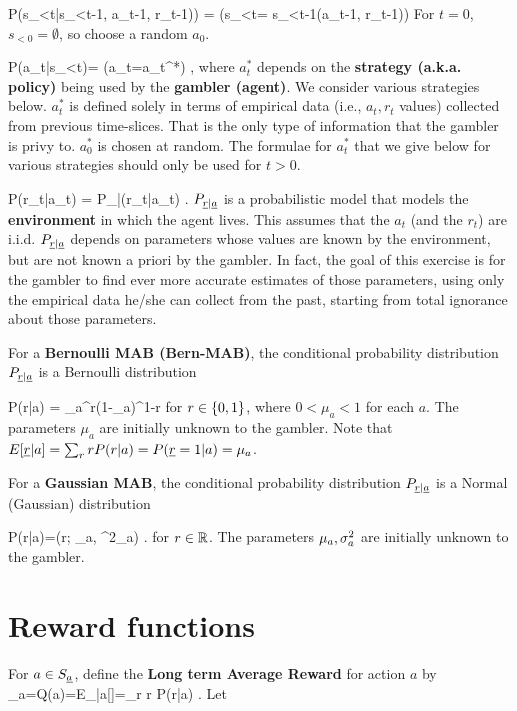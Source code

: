 \beq\color{blue}
P(s_{<t}|s_{<t-1}, a_{t-1}, r_{t-1})) = 
\indi(s_{<t}= s_{<t-1}\cup (a_{t-1}, r_{t-1}))
\eeq
For $t=0$, $s_{<0}=\emptyset$, so
 choose a random $a_0$.

\beq\color{blue}
P(a_t|s_{<t})= \indi(a_t=a_t^*)
\;\;
\;,
\eeq
where $a^*_t$ depends on the
 {\bf strategy (a.k.a. policy)} being used
by the {\bf gambler (agent)}.
We consider various
strategies below.
$a^*_t$ is defined
solely in terms
of empirical data
(i.e., $a_t, r_t$
values)
collected from previous 
time-slices.
That is the only  type of
information that
the gambler 
is privy to.
$a_0^*$ is chosen at random.
The formulae for $a_t^*$
that we give below 
for various strategies
should only be used for $t>0$.

\beq\color{blue}
P(r_t|a_t) =
P_{\rvr|\rva}(r_t|a_t)
\;\;
\;.
\eeq
$P_{{\underline{r}}|{\underline{a}}}$
is 
a probabilistic model that
models the {\bf environment}
in which the agent lives.
This 
assumes that the $a_t$ (and the $r_t$)
are i.i.d.
$P_{{\underline{r}}|{\underline{a}}}$ 
depends on parameters
whose values are known
by the environment, 
but 
are not known
a priori
by the gambler.
In fact, the goal
of this exercise is for
the gambler to
 find 
ever more accurate 
estimates of those parameters,
using only the empirical 
data he/she can collect
from the past,
starting from total
ignorance about those parameters.


For a {\bf Bernoulli MAB (Bern-MAB)}, the 
conditional probability 
distribution $P_{{\underline{r}}|{\underline{a}}}$
is
a Bernoulli distribution 

\beq
P(r|a) = \mu_a^r(1-\mu_a)^{1-r}
\eeq
for $r\in \{0,1\}$, where $0<\mu_a<1$ for each $a$.
The parameters $\mu_a$ are initially 
unknown to the gambler.
Note that $E[{\underline{r}}|a]=
\sum_r r P(r|a)=P({\underline{r}}=1|a)=\mu_a$.

For a {\bf Gaussian MAB}, the 
conditional probability 
distribution $P_{{\underline{r}}|{\underline{a}}}$
is
a Normal (Gaussian) distribution

\beq
P(r|a)=\caln(r; \mu_a, \s^2_a)
\;.
\eeq
for $r\in{ \mathbb{R}}$.
The parameters $\mu_a, \sigma^2_a$ are initially 
unknown to the gambler.
 
\section{Reward functions}




For $a\in S_{\underline{a}}$, define the 
{\bf Long term Average Reward} for action $a$ by
\beq
\mu_a=Q(a)=E_{|a}[\rvr]=\sum_r r P(r|a)
\;.
\eeq
Let

